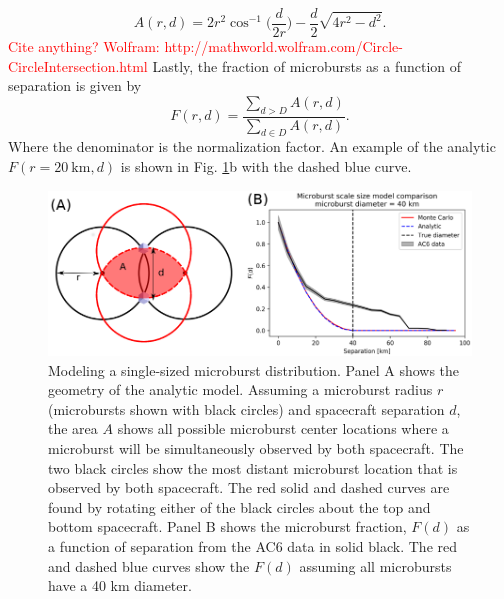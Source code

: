 \documentclass[draft]{agujournal2019}
\begin{document}
\begin{equation}
A(r, d) = 2r^2 \cos^{-1}{\Big( \frac{d}{2r} \Big)} - \frac{d}{2} \sqrt{4r^2 - d^2}.
\end{equation} \textcolor{red}{Cite anything? Wolfram: http://mathworld.wolfram.com/Circle-CircleIntersection.html} Lastly, the fraction of microbursts as a function of separation is given by 
\begin{equation}
F(r, d) = \frac{\sum_{d > D} A(r, d)}{\sum_{d \in D} A(r, d)}.
\end{equation} Where the denominator is the normalization factor. An example of the analytic $F(r=20 \ \mathrm{km}, d)$ is shown in Fig. \ref{fig5}b with the dashed blue curve. 



\begin{figure}
\includegraphics[width=\textwidth]{fig5.png}
\caption{Modeling a single-sized microburst distribution. Panel A shows the geometry of the analytic model. Assuming a microburst radius $r$ (microbursts shown with black circles) and spacecraft separation $d$, the area $A$ shows all possible microburst center locations where a microburst will be simultaneously observed by both spacecraft. The two black circles show the most distant microburst location that is observed by both spacecraft. The red solid and dashed curves are found by rotating either of the black circles about the top and bottom spacecraft. Panel B shows the microburst fraction, $F(d)$ as a function of separation from the AC6 data in solid black. The red and dashed blue curves show the $F(d)$ assuming all microbursts have a 40 km diameter.} 
\label{fig5}
\end{figure}
\end{document}

